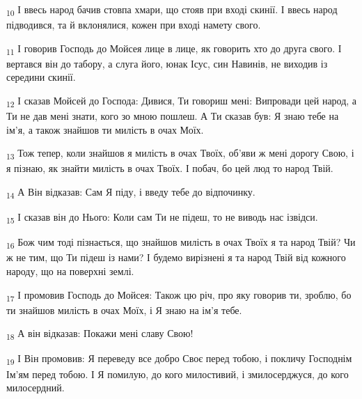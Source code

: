 \begin{tcolorbox}
\textsubscript{10} І ввесь народ бачив стовпа хмари, що стояв при вході скинії. І ввесь народ підводився, та й вклонялися, кожен при вході намету свого.
\end{tcolorbox}
\begin{tcolorbox}
\textsubscript{11} І говорив Господь до Мойсея лице в лице, як говорить хто до друга свого. І вертався він до табору, а слуга його, юнак Ісус, син Навинів, не виходив із середини скинії.
\end{tcolorbox}
\begin{tcolorbox}
\textsubscript{12} І сказав Мойсей до Господа: Дивися, Ти говориш мені: Випровади цей народ, а Ти не дав мені знати, кого зо мною пошлеш. А Ти сказав був: Я знаю тебе на ім'я, а також знайшов ти милість в очах Моїх.
\end{tcolorbox}
\begin{tcolorbox}
\textsubscript{13} Тож тепер, коли знайшов я милість в очах Твоїх, об'яви ж мені дорогу Свою, і я пізнаю, як знайти милість в очах Твоїх. І побач, бо цей люд то народ Твій.
\end{tcolorbox}
\begin{tcolorbox}
\textsubscript{14} А Він відказав: Сам Я піду, і введу тебе до відпочинку.
\end{tcolorbox}
\begin{tcolorbox}
\textsubscript{15} І сказав він до Нього: Коли сам Ти не підеш, то не виводь нас ізвідси.
\end{tcolorbox}
\begin{tcolorbox}
\textsubscript{16} Бож чим тоді пізнається, що знайшов милість в очах Твоїх я та народ Твій? Чи ж не тим, що Ти підеш із нами? І будемо вирізнені я та народ Твій від кожного народу, що на поверхні землі.
\end{tcolorbox}
\begin{tcolorbox}
\textsubscript{17} І промовив Господь до Мойсея: Також цю річ, про яку говорив ти, зроблю, бо ти знайшов милість в очах Моїх, і Я знаю на ім'я тебе.
\end{tcolorbox}
\begin{tcolorbox}
\textsubscript{18} А він відказав: Покажи мені славу Свою!
\end{tcolorbox}
\begin{tcolorbox}
\textsubscript{19} І Він промовив: Я переведу все добро Своє перед тобою, і покличу Господнім Ім'ям перед тобою. І Я помилую, до кого милостивий, і змилосерджуся, до кого милосердний.
\end{tcolorbox}
